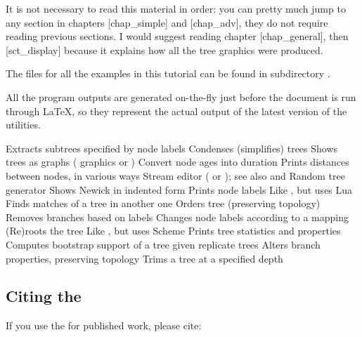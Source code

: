 It is not necessary to read this material in order: you can pretty much jump to
any section in chapters \in{}[chap_simple] and \in{}[chap_adv], they do not
require reading previous sections. I would suggest reading chapter
\in{}[chap_general], then [sct_display] because it explains how all
the tree graphics were produced.

The files for all the examples in this tutorial can be found in
subdirectory .

All the program outputs are generated on-the-fly just before the document is run
through \LaTeX{}, so they represent the actual output of the latest version of
the utilities.


\starttabulate[|l|l|]
  \MR
\HL
\NC \clade		\NC	Extracts subtrees specified by node labels \NC\MR
\NC \condense	\NC	Condenses (simplifies) trees \MR
\NC \display	\NC	Shows trees as graphs (\ascii{} graphics or \svg) \MR
\NC \duration	\NC	Convert node ages into duration \MR
\NC \distance	\NC	Prints distances between nodes, in various ways \MR
\NC \ed				\NC	Stream editor (  or ); see also \luaed{} and \sched \MR
\NC \gen			\NC	Random tree generator \MR
\NC \nwindent	\NC	Shows Newick in indented form \MR 
\NC {}		\NC	Prints node labels \MR
\NC \luaed				\NC	Like \ed, but uses Lua\MR
\NC \match		\NC	Finds matches of a tree in another one \MR
\NC \order		\NC	Orders tree (preserving topology) \MR
\NC \prune		\NC	Removes branches based on labels \MR 
\NC \rename		\NC	Changes node labels according to a mapping \MR
\NC \reroot		\NC	(Re)roots the tree \MR
\NC \sched				\NC	Like \luaed, but uses Scheme\MR
\NC \stats		\NC	Prints tree statistics and properties \MR
\NC \support	\NC	Computes bootstrap support of a tree given replicate trees \MR
\NC \topology	\NC	Alters branch properties, preserving topology \MR
\NC \trim		\NC	Trims a tree at a specified depth
\stoptabulate

\subsection*{Citing the \nutils}

If you use the \nutils{} for published work, please cite:


